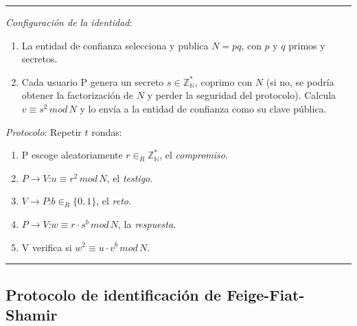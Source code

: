 \rule{\textwidth}{1pt}
\begin{algorithm}
	\hfil
	
	\textit{Configuración de la identidad}:
	\begin{enumerate}
		\item La entidad de confianza selecciona y publica $N=pq$, con $p$ y $q$ primos y secretos.
		
		\item Cada usuario P genera un secreto $s \in \mathbb{Z_N^*}$, coprimo con $N$ (si no, se podría obtener la factorización de $N$ y perder la seguridad del protocolo). Calcula $v \equiv s^2 \, mod \, N$ y lo envía a la entidad de confianza como su clave pública.
		
	\end{enumerate}
	
	
	\textit{Protocolo}: Repetir $t$ rondas:
	\begin{enumerate}
		\item P escoge aleatoriamente $r \in_R \mathbb{Z_N^*}$, el \textit{compromiso}.
		\item $P \rightarrow V$:\quad $u \equiv r^2 \, mod \, N$, el \textit{testigo}.
		\item $V \rightarrow P$:\quad $b \in_R \{0,1\}$, el \textit{reto}.
		\item $P \rightarrow V$:\quad $w \equiv r\cdot s^b \, mod \, N$, la \textit{respuesta}.
		\item V verifica si \quad $ w^2 \equiv u\cdot v^b \, mod \, N$.
	\end{enumerate}
	
\end{algorithm}
\rule{\textwidth}{1pt}







\subsection{Protocolo de identificación de Feige-Fiat-Shamir}

